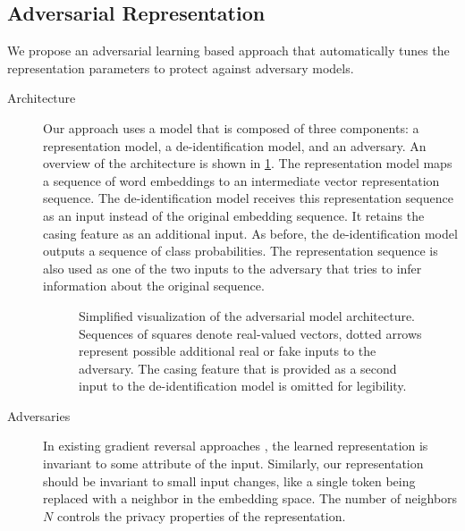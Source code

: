 
\subsection{Adversarial Representation}\label{sec:adversarial-representation}
%
We propose an adversarial learning based approach that automatically tunes the representation parameters to protect against adversary models.

\begin{description}
    \item[Architecture]
    Our approach uses a model that is composed of three components: a representation model, a de-identification model, and an adversary.
    An overview of the architecture is shown in \cref{fig:adversarial-model}.
    The representation model maps a sequence of word embeddings to an intermediate vector representation sequence.
    The de-identification model receives this representation sequence as an input instead of the original embedding sequence.
    It retains the casing feature as an additional input.
    As before, the de-identification model outputs a sequence of class probabilities.
    The representation sequence is also used as one of the two inputs to the adversary that tries to infer information about the original sequence.

    \begin{figure}
        \centering
        
        \caption[Adversarial model architecture]{%
            Simplified visualization of the adversarial model architecture.
            Sequences of squares denote real-valued vectors, dotted arrows represent possible additional real or fake inputs to the adversary.
            The casing feature that is provided as a second input to the de-identification model is omitted for legibility.}\label{fig:adversarial-model}
    \end{figure}
    
    \item[Adversaries]
    In existing gradient reversal approaches \citep{ganin2016domain,feutry2018learning,elazar2018adversarial}, the learned representation is invariant to some attribute of the input.
    Similarly, our representation should be invariant to small input changes, like a single token being replaced with a neighbor in the embedding space.
    The number of neighbors $N$ controls the privacy properties of the representation.
    

\end{description}
